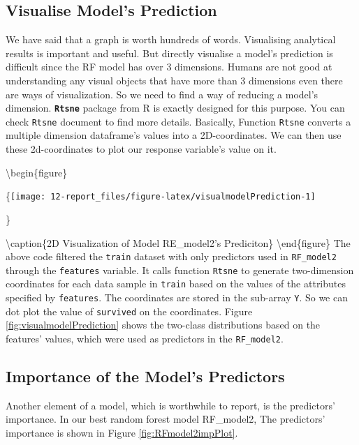 \documentclass[
]{book}
\begin{document}
\hypertarget{visualise-models-prediction}{%
\subsection*{Visualise Model's Prediction}\label{visualise-models-prediction}}


We have said that a graph is worth hundreds of words. Visualising analytical results is important and useful. But directly visualise a model's prediction is difficult since the RF model has over 3 dimensions. Humans are not good at understanding any visual objects that have more than 3 dimensions even there are ways of visualization. So we need to find a way of reducing a model's dimension. \textbf{\texttt{Rtsne}} package from R is exactly designed for this purpose. You can check \texttt{Rtsne} document to find more details. Basically, Function \texttt{Rtsne} converts a multiple dimension dataframe's values into a 2D-coordinates. We can then use these 2d-coordinates to plot our response variable's value on it.

\textbackslash begin\{figure\}

\{\centering \texttt{[image: 12-report\_files/figure-latex/visualmodelPrediction-1]}

\}

\textbackslash caption\{2D Visualization of Model RE\_model2's Prediciton\}\label{fig:visualmodelPrediction}
\textbackslash end\{figure\}
The above code filtered the \texttt{train} dataset with only predictors used in \texttt{RF\_model2} through the \texttt{features} variable. It calls function \texttt{Rtsne} to generate two-dimension coordinates for each data sample in \texttt{train} based on the values of the attributes specified by \texttt{features}. The coordinates are stored in the sub-array \texttt{Y}. So we can dot plot the value of \texttt{survived} on the coordinates. Figure \ref{fig:visualmodelPrediction} shows the two-class distributions based on the features' values, which were used as predictors in the \texttt{RF\_model2}.

\hypertarget{importance-of-the-models-predictors}{%
\subsection*{Importance of the Model's Predictors}\label{importance-of-the-models-predictors}}


Another element of a model, which is worthwhile to report, is the predictors' importance. In our best random forest model RF\_model2, The predictors' importance is shown in Figure \ref{fig:RFmodel2impPlot}.
\end{document}
